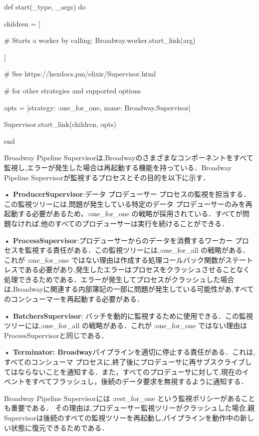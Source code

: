 \documentclass[a4paper]{jreport}	%
\begin{document}
def start(\_type, \_args) do 

children = [

    \# Starts a worker by calling: Broadway.worker.start\_link(arg)
    
    
]

 \# See https://hexdocs.pm/elixir/Supervisor.html

 \# for other strategies and supported options

opts = [strategy: :one\_for\_one, name: Broadway.Supervisor] 

Supervisor.start\_link(children, opts)

end

Broadway Pipeline Supervisorは,Broadwayのさまざまなコンポーネントをすべて監視し,エラーが発生した場合は再起動する機能を持っている．Broadway Pipeline Supervisorが監視するプロセスとその目的を以下に示す．

\textbf{• ProducerSupervisor}:データ プロデューサー プロセスの監視を担当する． この監視ツリーには,問題が発生している特定のデータ プロデューサーのみを再起動する必要があるため，:one\_for\_one の戦略が採用されている．すべてが問題なければ,他のすべてのプロデューサーは実行を続けることができる．

\textbf{• ProcessSupervisor}:プロデューサーからのデータを消費するワーカー プロセスを監視する責任がある．この監視ツリーには,:one\_for\_all の戦略がある．これが :one\_for\_one ではない理由は作成する処理コールバック関数がステートレスである必要があり,発生したエラーはプロセスをクラッシュさせることなく処理できるためである．エラーが発生してプロセスがクラッシュした場合は,Broadwayに関連する内部簿記の一部に問題が発生している可能性があ,すべてのコンシューマーを再起動する必要がある．

\textbf{• BatchersSupervisor}: バッチを動的に監視するために使用できる．この監視ツリーには,:one\_for\_all の戦略がある．これが :one\_for\_one ではない理由はProcessSupervisorと同じである．

\textbf{• Terminator: Broadway}パイプラインを適切に停止する責任がある．これは,すべてのコンシューマ プロセスに,終了後にプロデューサに再サブスクライブしてはならないことを通知する．また，すべてのプロデューサに対して,現在のイベントをすべてフラッシュし，後続のデータ要求を無視するように通知する．

Broadway Pipeline Supervisorには :rest\_for\_one という監視ポリシーがあることも重要である． その理由は,プロデューサー監視ツリーがクラッシュした場合,親Supervisorは後続のすべての監視ツリーを再起動し,パイプラインを動作中の新しい状態に復元できるためである．
\end{document}
